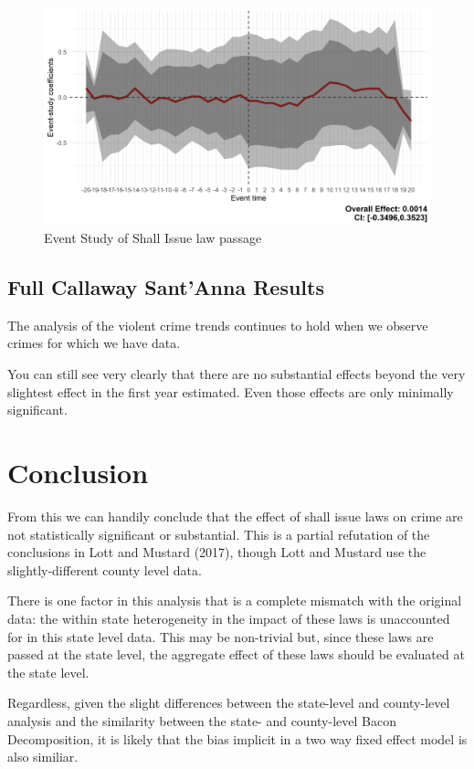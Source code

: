\documentclass{article}
\begin{document}
\begin{figure}[H]
    \begin{center}
        \includegraphics[width=.85\textwidth]{SA_EventStudy.png}
    \end{center}
    \caption{Event Study of Shall Issue law passage}
    \label{fig:ESFig}
\end{figure}

\subsection*{Full Callaway Sant'Anna Results}

The analysis of the violent crime trends continues to hold when we observe  crimes for which we have data.





You can still see very clearly that there are no substantial effects beyond the very slightest effect in the first year estimated. Even those effects are only minimally significant.

\section{Conclusion}

From this we can handily conclude that the effect of shall issue laws on crime are not statistically significant or substantial. This is a partial refutation of the conclusions in Lott and Mustard (2017), though Lott and Mustard use the slightly-different county level data.

There is one factor in this analysis that is a complete mismatch with the original data: the within state heterogeneity in the impact of these laws is unaccounted for in this state level data. This may be non-trivial but, since these laws are passed at the state level, the aggregate effect of these laws should be evaluated at the state level. 

Regardless, given the slight differences between the state-level and county-level analysis and the similarity between the state- and county-level Bacon Decomposition, it is likely that the bias implicit in a two way fixed effect model is also similiar.




\end{document}
